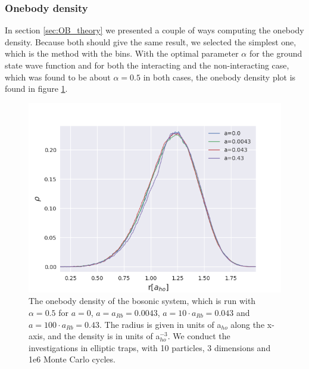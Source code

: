 \documentclass[norsk,a4paper,12pt]{article}
\begin{document}
\subsubsection{Onebody density}
In section \ref{sec:OB_theory} we presented a couple of ways computing the onebody density. Because both should give the same result, we selected the simplest one, which is the method with the bins. With the optimal parameter $\alpha$ for the ground state wave function and for both the interacting and the non-interacting case, which was found to be about $\alpha=0.5$ in both cases, the onebody density plot is found in figure \ref{fig:ob0}.

\begin{figure} [H]
    \centering
    \includegraphics[scale=0.80]{images/ob.png}
    \caption{The onebody density of the bosonic system, which is run with $\alpha=0.5$ for $a=0$, $a=a_{Rb}=0.0043$, $a=10\cdot a_{Rb}=0.043$ and $a=100\cdot a_{Rb}=0.43$. The radius is given in units of a$_{ho}$ along the x-axis, and the density is in units of a$_{ho}^{-3}$. We conduct the investigations in elliptic traps, with 10 particles, 3 dimensions and 1e6 Monte Carlo cycles.}
    \label{fig:ob0}
\end{figure}
\end{document}
